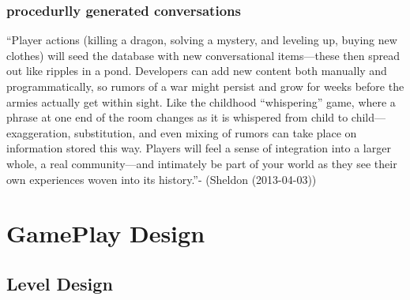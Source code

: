 \documentclass[11pt,fleqn]{book} %
\begin{document}
\subsection{procedurlly generated conversations}
“Player actions (killing a dragon, solving a mystery, and leveling up, buying new clothes) will seed the database with new conversational items—these then spread out like ripples in a pond. Developers can add new content both manually and programmatically, so rumors of a war might persist and grow for weeks before the armies actually get within sight. Like the childhood “whispering” game, where a phrase at one end of the room changes as it is whispered from child to child—exaggeration, substitution, and even mixing of rumors can take place on information stored this way. Players will feel a sense of integration into a larger whole, a real community—and intimately be part of your world as they see their own experiences woven into its history.”- (Sheldon (2013-04-03))
\newpage



\chapter{GamePlay Design}


\vspace{1em}

\section {Level Design}
\end{document}
